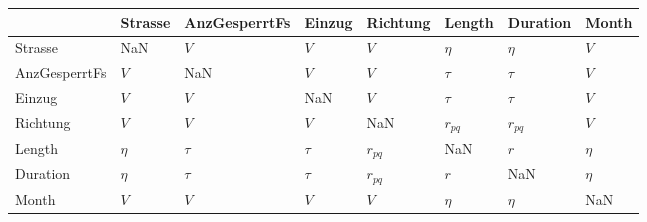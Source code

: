 \begin{tabular}{llllllll}
\toprule
{} & Strasse & AnzGesperrtFs &  Einzug &  Richtung &    Length &  Duration &   Month \\
\midrule
Strasse       &     NaN &           $V$ &     $V$ &       $V$ &    $\eta$ &    $\eta$ &     $V$ \\
AnzGesperrtFs &     $V$ &           NaN &     $V$ &       $V$ &    $\tau$ &    $\tau$ &     $V$ \\
Einzug        &     $V$ &           $V$ &     NaN &       $V$ &    $\tau$ &    $\tau$ &     $V$ \\
Richtung      &     $V$ &           $V$ &     $V$ &       NaN &  $r_{pq}$ &  $r_{pq}$ &     $V$ \\
Length        &  $\eta$ &        $\tau$ &  $\tau$ &  $r_{pq}$ &       NaN &       $r$ &  $\eta$ \\
Duration      &  $\eta$ &        $\tau$ &  $\tau$ &  $r_{pq}$ &       $r$ &       NaN &  $\eta$ \\
Month         &     $V$ &           $V$ &     $V$ &       $V$ &    $\eta$ &    $\eta$ &     NaN \\
\bottomrule
\end{tabular}
